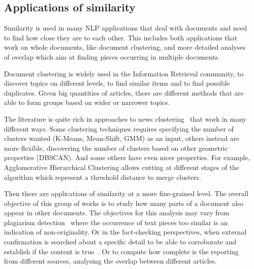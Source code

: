 \subsection{Applications of similarity}

Similarity is used in many NLP applications that deal with documents and need to find how close they are to each other. This includes both applications that work on whole documents, like document clustering, and more detailed analyses of overlap which aim at finding pieces occurring in multiple documents.

Document clustering is widely used in the Information Retrieval community, to discover topics on different levels, to find similar items and to find possible duplicates. Given big quantities of articles, there are different methods that are able to form groups based on wider or narrower topics.

The literature is quite rich in approaches to news clustering~\cite{carpineto2009survey,andrews2007recent} %
that work in many different ways.
Some clustering techniques requires specifying the number of clusters wanted (K-Means, Mean-Shift, GMM) as an input, others instead are more flexible, discovering the number of clusters based on other geometric properties (DBSCAN).
And some others have even nicer properties.
For example, Agglomerative Hierarchical Clustering allows cutting at different stages of the algorithm which represent a threshold distance to merge clusters.






Then there are applications of similarity at a more fine-grained level.
The overall objective of this group of works is to study how many parts of a document also appear in other documents.
The objectives for this analysis may vary from plagiarism detection~\cite{potthast2010evaluation} where the occurrence of text pieces too similar is an indication of non-originality.
Or in the fact-checking perspectives, when external confirmation is searched about a specific detail to be able to corroborate and establish if the content is true~\cite{karadzhov2017fully}.
Or to compute how complete is the reporting from different sources, analysing the overlap between different articles.

